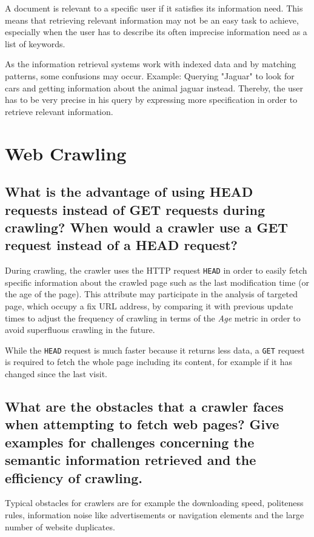 \documentclass{scrartcl}
\newcommand*{\inlinecode}[1]{\texttt{#1}}
\begin{document}
A document is relevant to a specific user if it satisfies its information need. This means that retrieving relevant information may not be an easy task to achieve, especially when the user has to describe its often imprecise information need as a list of keywords.

As the information retrieval systems work with indexed data and by matching patterns, some confusions may occur. Example: Querying "Jaguar" to look for cars and getting information about the animal jaguar instead. Thereby, the user has to be very precise in his query by expressing more specification in order to retrieve relevant information.


\section{Web Crawling}

\subsection{What is the advantage of using HEAD requests instead of GET requests during crawling?
	When would a crawler use a GET request instead of a HEAD request?}

During crawling, the crawler uses the HTTP request \inlinecode{HEAD} in order to easily fetch specific information about the crawled page such as the last modification time (or the age of the page). This attribute may participate in the analysis of targeted page, which occupy a fix URL address, by comparing it with previous update times to adjust the frequency of crawling in terms of the \textit{Age} metric in order to avoid superfluous crawling in the future.

While the \inlinecode{HEAD} request is much faster because it returns less data, a \inlinecode{GET} request is required to fetch the whole page including its content, for example if it has changed since the last visit.

\subsection{What are the obstacles that a crawler faces when attempting to fetch web pages? Give
	examples for challenges concerning the semantic information retrieved and the efficiency of
	crawling.}

Typical obstacles for crawlers are for example the downloading speed, politeness rules, information noise like advertisements or navigation elements and the large number of website duplicates.
\end{document}
